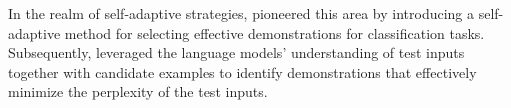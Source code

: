     In the realm of self-adaptive strategies, \citet{wu-etal-2023-self} pioneered this area by introducing a self-adaptive method for selecting effective demonstrations for classification tasks.
    Subsequently, \citet{peng-etal-2024-revisiting} leveraged the language models' understanding of test inputs together with candidate examples to identify demonstrations that effectively minimize the perplexity of the test inputs.

